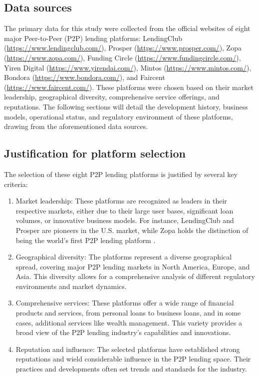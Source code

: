 \documentclass{article}
\begin{document}
\subsection{Data sources}
The primary data for this study were collected from the official websites of eight major Peer-to-Peer (P2P) lending platforms: LendingClub (\href{https://www.lendingclub.com/}{https://www.lendingclub.com/}), Prosper (\href{https://www.prosper.com/}{https://www.prosper.com/}), Zopa (\href{https://www.zopa.com/}{https://www.zopa.com/}), Funding Circle (\href{https://www.fundingcircle.com/}{https://www.fundingcircle.com/}), Yiren Digital (\href{https://www.yirendai.com/}{https://www.yirendai.com/}), Mintos (\href{https://www.mintos.com/}{https://www.mintos.com/}), Bondora (\href{https://www.bondora.com/}{https://www.bondora.com/}), and Faircent (\href{https://www.faircent.com/}{https://www.faircent.com/}). These platforms were chosen based on their market leadership, geographical diversity, comprehensive service offerings, and reputations. The following sections will detail the development history, business models, operational status, and regulatory environment of these platforms, drawing from the aforementioned data sources.

\subsection{Justification for platform selection}

The selection of these eight P2P lending platforms is justified by several key criteria:
\begin{enumerate}
    \item Market leadership: These platforms are recognized as leaders in their respective markets, either due to their large user bases, significant loan volumes, or innovative business models. For instance, LendingClub and Prosper are pioneers in the U.S. market, while Zopa holds the distinction of being the world’s first P2P lending platform \citep{bednorz_history_2023}.
    \item Geographical diversity: The platforms represent a diverse geographical spread, covering major P2P lending markets in North America, Europe, and Asia. This diversity allows for a comprehensive analysis of different regulatory environments and market dynamics.
    \item Comprehensive services: These platforms offer a wide range of financial products and services, from personal loans to business loans, and in some cases, additional services like wealth management. This variety provides a broad view of the P2P lending industry's capabilities and innovations.
    \item Reputation and influence: The selected platforms have established strong reputations and wield considerable influence in the P2P lending space. Their practices and developments often set trends and standards for the industry.
\end{enumerate}
\end{document}
